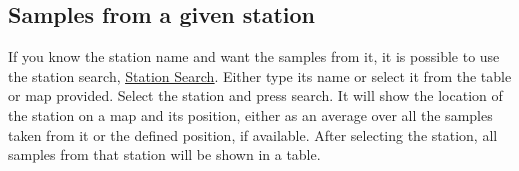 \documentclass[a4paper,english, 11pt]{article}
\begin{document}
\subsection{Samples from a given station} %
\label{sub:station_search}

If you know the station name and want the samples from it, it is possible to use the station search,  \href{https://sios-svalbard.org/aen/stations}{\color{blue}\underline{Station Search}}. Either type its name or select it from the table or map provided. Select the station and press search. It will show the location of the station on a map and its position, either as an average over all the samples taken from it or the defined position, if available. After selecting the station, all samples from that station will be shown in a table.



%


\end{document}
